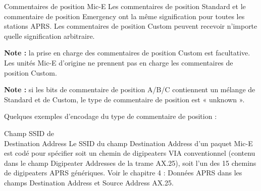 \begin{aprssideblock}{Commentaires de position Mic-E}
Les commentaires de position Standard et le commentaire de position Emergency
ont la même signification pour toutes les stations APRS. Les commentaires de
position Custom peuvent recevoir n'importe quelle signification arbitraire.

\textbf{Note :} la prise en charge des commentaires de position Custom est
facultative. Les unités Mic-E d'origine ne prennent pas en charge les
commentaires de position Custom.

\textbf{Note :} si les bits de commentaire de position A/B/C contiennent un
mélange de  Standard et de  Custom, le type de commentaire de
position est « unknown ».
\end{aprssideblock}

\begin{aprsbodyblock}
Quelques exemples d'encodage du type de commentaire de position :

\begin{center}
\small\sffamily
\setlength{\tabcolsep}{3.5pt}\renewcommand{\arraystretch}{1.70}
\end{center}
\end{aprsbodyblock}

\begin{aprssideblock}{Champ SSID de\\Destination Address}
Le SSID du champ Destination Address d'un paquet Mic-E est codé pour spécifier
soit un chemin de digipeaters VIA conventionnel (contenu dans le champ
Digipeater Addresses de la trame AX.25), soit l'un des 15 chemins de
digipeaters APRS génériques. Voir le chapitre 4 : Données APRS dans les champs
Destination Address et Source Address AX.25.
\end{aprssideblock}

